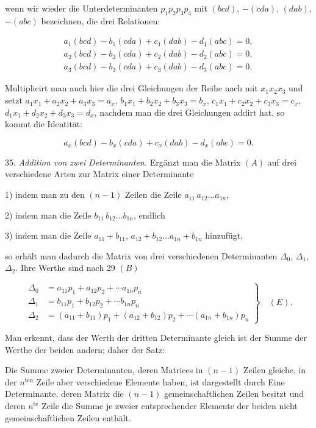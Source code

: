 \documentclass[11pt]{article}
\providecommand{\weberpage}[1]{}
\providecommand{\weq}[2]{\begin{equation}\tag{#1}#2\end{equation}}
\let\Delta\varDelta
\begin{document}
wenn wir wieder die Unterdeterminanten $p_1p_2p_3p_4$ mit $(bcd)$,
$-(cda)$, $(dab)$, $-(abc)$ bezeichnen, die drei Relationen:

\[
\begin{gathered}
a_1(bcd)-b_1(cda)+c_1(dab)-d_1(abc)=0,\\
a_2(bcd)-b_2(cda)+c_2(dab)-d_2(abc)=0,\\
a_3(bcd)-b_3(cda)+c_3(dab)-d_3(abc)=0.
\end{gathered}
\]

Multiplicirt man auch hier die drei Gleichungen der Reihe nach mit
$x_1x_2x_3$ und setzt $a_1x_1+a_2x_2+a_3x_3=a_x$,
$b_1x_1+b_2x_2+b_3x_3=b_x$, $c_1x_1+c_2x_2+c_3x_3=c_x$,
$d_1x_1+d_2x_2+d_3x_3=d_x$, nachdem man die drei Gleichungen addirt hat,
so kommt die Identität:

\weq{II}{a_x(bcd)-b_x(cda)+c_x(dab)-d_x(abc)=0.}


\weberpage{40}
35. \textit{Addition von zwei Determinanten.} Ergänzt man die Matrix
$(A)$ auf drei verschiedene Arten zur Matrix einer Determinante

1) indem man zu den $(n-1)$ Zeilen die Zeile $a_{11}\,a_{12}\ldots
a_{1n}$,

2) indem man die Zeile $b_{11}\,b_{12}\ldots b_{1n}$, endlich

3) indem man die Zeile $a_{11}+b_{11},\,a_{12}+b_{12}\ldots
a_{1n}+b_{1n}$ hinzufügt,

so erhält man dadurch die Matrix von drei verschiedenen Determinanten
$\Delta_0$, $\Delta_1$, $\Delta_2$. Ihre Werthe sind nach 29 $(B)$

\[
\left.
\begin{aligned}
\Delta_0 &= a_{11}p_1+a_{12}p_2+\cdots a_{1n}p_n\\
\Delta_1 &= b_{11}p_1+b_{12}p_2+\cdots b_{1n}p_n\\
\Delta_2 &= (a_{11}+b_{11})p_1+(a_{12}+b_{12})p_2+\cdots (a_{1n}+b_{1n})p_n
\end{aligned}
\right\}
\quad (E).
\]

Man erkennt, dass der Werth der dritten Determinante gleich ist der
Summe der Werthe der beiden andern; daher der Satz:

\glqq Die Summe zweier Determinanten, deren Matrices in $(n-1)$ Zeilen
gleiche, in der $n^{\text{ten}}$ Zeile aber verschiedene Elemente haben,
ist dargestellt durch Eine Determinante, deren Matrix die $(n-1)$
gemeinschaftlichen Zeilen besitzt und deren $n^{\text{te}}$ Zeile die
Summe je zweier entsprechender Elemente der beiden nicht
gemeinschaftlichen Zeilen enthält.\grqq{}
\end{document}
